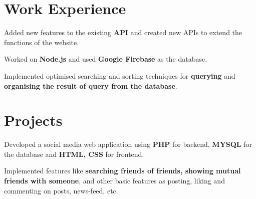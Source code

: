 \documentclass[]{deedy-resume-openfont}
\begin{document}
\hfill
\begin{minipage}[t]{0.66\textwidth} 


\section{Work Experience}
\mbox{}
\vspace{\topsep}
\begin{tightemize}
\item Added new features to the existing \textbf{API} and created new APIs to extend the functions of the website.
\item Worked on \textbf{Node.js} and used \textbf{Google Firebase} as the database.
\item Implemented optimised searching and sorting techniques for \textbf{querying} and \textbf{organising the result of query from the database}.
\end{tightemize}
\sectionsep




\section{Projects}
\begin{tightemize}
\item Developed a social media web application using \textbf{PHP} for backend, \textbf{MYSQL} for the database and \textbf{HTML, CSS} for frontend.
\item Implemented features like \textbf{searching friends of friends, showing mutual friends with someone}, and other basic features as posting, liking and commenting on posts, news-feed, etc.
\end{tightemize} 
\sectionsep


\end{minipage}
\end{document}
